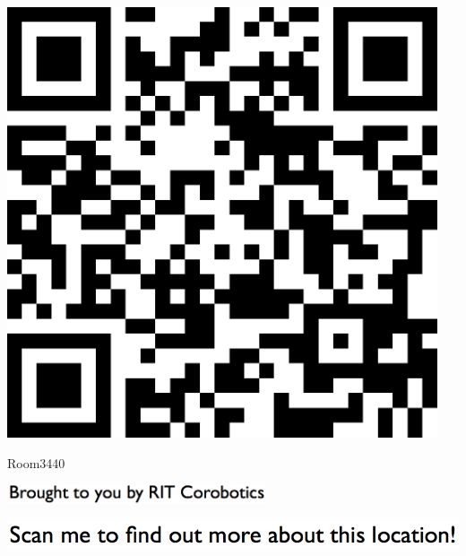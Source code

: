 \documentclass[letterpaper]{article}
\begin{document}
 \begingroup 
 \centerline{\includegraphics[scale=1,width=5in,height=5in]{Room3440.png}} 
 \endgroup 
 \vspace*{\fill} 

 \hfill{\small Room3440} 

  \vspace{0.7in} 
 
 \centerline{\includegraphics[scale=1,width=3in]{text-bottom.png}} 
 
 \pagebreak 
{} 
 \vspace*{\fill} 
 
  \centerline{\includegraphics[scale=1,width=6in]{text-top.png}} 
 
 \vspace{0.5in} 
 
\end{document}
